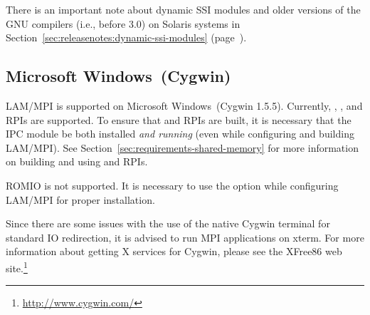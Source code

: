  There is an important note about dynamic SSI modules
and older versions of the GNU compilers (i.e., before 3.0) on Solaris
systems in Section~\ref{sec:releasenotes:dynamic-ssi-modules}
(page~\pageref{sec:releasenotes:dynamic-ssi-modules}).



\subsection{Microsoft Windows\trademark\ (Cygwin)}


LAM/MPI is supported on Microsoft Windows\trademark\ (Cygwin 1.5.5).
Currently, , ,  and  RPIs are
supported.  To ensure that  and  RPIs are built,
it is necessary that the IPC module be both installed {\em and
  running} (even while configuring and building LAM/MPI).  See
Section~\ref{sec:requirements-shared-memory} for more information on
building and using  and  RPIs.

ROMIO is not supported.  It is necessary to use the
 option while configuring LAM/MPI for proper
installation.

Since there are some issues with the use of the native 
Cygwin terminal for standard IO redirection, it is 
advised to run MPI applications on xterm.  
For more information about getting X services for Cygwin, please
see the XFree86 web site.\footnote{\url{http://www.cygwin.com/}}




